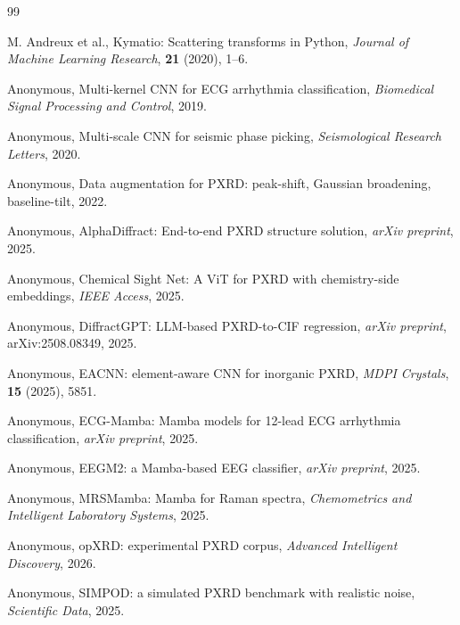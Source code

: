 \documentclass[final]{ws-ijwmip}
\begin{document}


\begin{thebibliography}{99}

M. Andreux et al., Kymatio: Scattering transforms in Python,
\emph{Journal of Machine Learning Research}, \textbf{21} (2020),
1--6.

Anonymous, Multi-kernel CNN for ECG arrhythmia classification,
\emph{Biomedical Signal Processing and Control}, 2019.

Anonymous, Multi-scale CNN for seismic phase picking,
\emph{Seismological Research Letters}, 2020.

Anonymous, Data augmentation for PXRD: peak-shift, Gaussian
broadening, baseline-tilt, 2022.

Anonymous, AlphaDiffract: End-to-end PXRD structure solution,
\emph{arXiv preprint}, 2025.

Anonymous, Chemical Sight Net: A ViT for PXRD with chemistry-side
embeddings, \emph{IEEE Access}, 2025.

Anonymous, DiffractGPT: LLM-based PXRD-to-CIF regression,
\emph{arXiv preprint}, arXiv:2508.08349, 2025.

Anonymous, EACNN: element-aware CNN for inorganic PXRD,
\emph{MDPI Crystals}, \textbf{15} (2025), 5851.

Anonymous, ECG-Mamba: Mamba models for 12-lead ECG arrhythmia
classification, \emph{arXiv preprint}, 2025.

Anonymous, EEGM2: a Mamba-based EEG classifier, \emph{arXiv preprint}, 2025.

Anonymous, MRSMamba: Mamba for Raman spectra,
\emph{Chemometrics and Intelligent Laboratory Systems}, 2025.

Anonymous, opXRD: experimental PXRD corpus,
\emph{Advanced Intelligent Discovery}, 2026.

Anonymous, SIMPOD: a simulated PXRD benchmark with realistic noise,
\emph{Scientific Data}, 2025.


\end{thebibliography}
\end{document}
